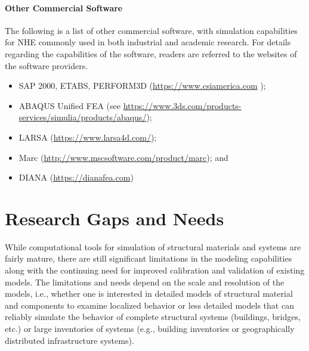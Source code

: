 \paragraph{Other Commercial Software} The following is a list of other commercial software, with simulation capabilities for NHE commonly used in both industrial and academic research.  For details regarding the capabilities of the software, readers are referred to the websites of the software providers.

\begin{itemize}
    \item SAP 2000, ETABS, PERFORM3D (\url{https://www.csiamerica.com} );

    \item ABAQUS Unified FEA (see \url{https://www.3ds.com/products-services/simulia/products/abaqus/});

    \item LARSA (\url{https://www.larsa4d.com/});

    \item Marc (\url{http://www.mscsoftware.com/product/marc}); and

    \item DIANA (\url{https://dianafea.com})
\end{itemize}

\section{Research Gaps and Needs}
\label{sec:resp_struct_gaps}

While computational tools for simulation of structural materials and systems are fairly mature, there are still significant limitations in the modeling capabilities along with the continuing need for improved calibration and validation of existing models. The limitations and needs depend on the scale and resolution of the models, i.e., whether one is interested in detailed models of structural material and components to examine localized behavior or less detailed models that can reliably simulate the behavior of complete structural systems (buildings, bridges, etc.) or large inventories of systems (e.g., building inventories or geographically distributed infrastructure systems).

